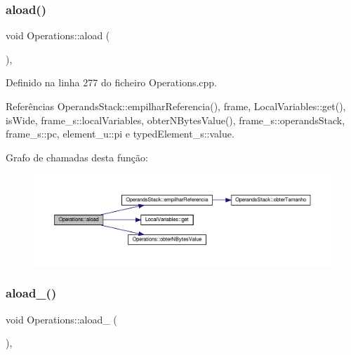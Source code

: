 \subsubsection{\texorpdfstring{aload()}{aload()}}
{\footnotesize\ttfamily void Operations\+::aload (\begin{DoxyParamCaption}{ }\end{DoxyParamCaption})\hspace{0.3cm}{\ttfamily [static]}, {\ttfamily [private]}}



Definido na linha 277 do ficheiro Operations.\+cpp.



Referências Operands\+Stack\+::empilhar\+Referencia(), frame, Local\+Variables\+::get(), is\+Wide, frame\+\_\+s\+::local\+Variables, obter\+N\+Bytes\+Value(), frame\+\_\+s\+::operands\+Stack, frame\+\_\+s\+::pc, element\+\_\+u\+::pi e typed\+Element\+\_\+s\+::value.

Grafo de chamadas desta função\+:\nopagebreak
\begin{figure}[H]
\begin{center}
\leavevmode
\includegraphics[width=350pt]{classOperations_a2f5c13146658e71de665c3b32ebed8c9_cgraph}
\end{center}
\end{figure}
\mbox{\label{classOperations_a9d821a16ef0681755717e8c4f740f6d0}} 
\subsubsection{\texorpdfstring{aload\+\_()}{aload\_0()}}
{\footnotesize\ttfamily void Operations\+::aload\+\_ (\begin{DoxyParamCaption}{ }\end{DoxyParamCaption})\hspace{0.3cm}{\ttfamily [static]}, {\ttfamily [private]}}



